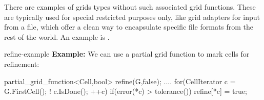 There are examples of grids types without such associated grid functions.
These are typically used for special restricted purposes only,
like grid adapters for input from a file, which offer a clean way 
to encapsulate specific file formats from the rest of the world.
An example is 
.


\begin{Label}{refine-example}
{\bf Example:}
We can use  a partial grid function to mark cells for refinement:
\begin{example}
partial\_grid\_function<Cell,bool> refine(G,false);
....
for(CellIterator c = G.FirstCell(); ! c.IsDone(); ++c)
 if(error(*c) > tolerance())
   refine[*c] = true;
\end{example}
\end{Label}
